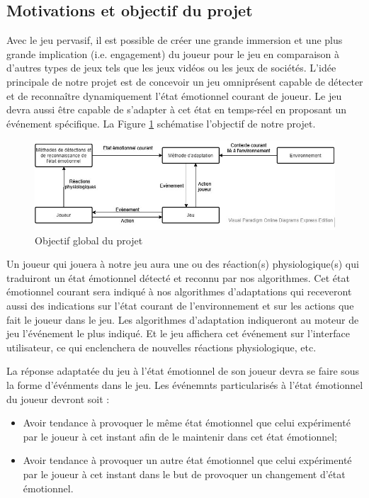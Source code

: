 \documentclass{article}
\begin{document}
	\subsection{Motivations et objectif du projet}\label{sec:objectif}
		Avec le jeu pervasif, il est possible de créer une grande immersion et une plus grande implication (i.e. engagement) du joueur pour le jeu en comparaison à d'autres types de jeux tels que les jeux vidéos ou les jeux de sociétés.
		L'idée principale de notre projet est de concevoir un jeu omniprésent capable de détecter et de reconnaître dynamiquement l'état émotionnel courant de joueur. 
		Le jeu devra aussi être capable de s'adapter à cet état en temps-réel en proposant un événement spécifique. 
		La Figure \ref{fig:motivation} schématise l'objectif de notre projet.
		\begin{figure}
			\centering
			\includegraphics[scale=0.75]{../include/motivation.jpg}
			\caption{Objectif global du projet}
			\label{fig:motivation}
		\end{figure}
		Un joueur qui jouera à notre jeu aura une ou des réaction(s) physiologique(s) qui traduiront un état émotionnel détecté et reconnu par nos algorithmes.
		Cet état émotionnel courant sera indiqué à nos algorithmes d'adaptations qui receveront aussi des indications sur l'état courant de l'environnement et sur les actions que fait le joueur dans le jeu.
		Les algorithmes d'adaptation indiqueront au moteur de jeu l'événement le plus indiqué.
		Et le jeu affichera cet événement sur l'interface utilisateur, ce qui enclenchera de nouvelles réactions physiologique, etc.\par
		La réponse adaptatée du jeu à l'état émotionnel de son joueur devra se faire sous la forme d'événments dans le jeu.
		Les événemnts particularisés à l'état émotionnel du joueur devront soit :
		\begin{itemize}
			\item Avoir tendance à provoquer le même état émotionnel que celui expérimenté par le joueur à cet instant afin de le maintenir dans cet état émotionnel;
			\item Avoir tendance à provoquer un autre état émotionnel que celui expérimenté par le joueur à cet instant dans le but de provoquer un changement d'état émotionnel.
		\end{itemize}
\end{document}
